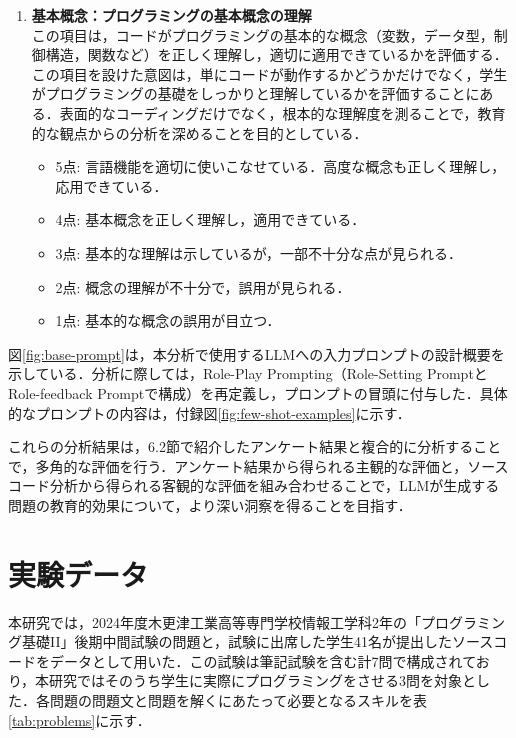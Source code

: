 \documentclass[11pt]{jreport}
\begin{document}
\begin{enumerate}
    \item \textbf{基本概念：プログラミングの基本概念の理解} \\
    この項目は，コードがプログラミングの基本的な概念（変数，データ型，制御構造，関数など）を正しく理解し，適切に適用できているかを評価する．この項目を設けた意図は，単にコードが動作するかどうかだけでなく，学生がプログラミングの基礎をしっかりと理解しているかを評価することにある．表面的なコーディングだけでなく，根本的な理解度を測ることで，教育的な観点からの分析を深めることを目的としている．
    \begin{itemize}
        \item 5点: 言語機能を適切に使いこなせている．高度な概念も正しく理解し，応用できている．
        \item 4点: 基本概念を正しく理解し，適用できている．
        \item 3点: 基本的な理解は示しているが，一部不十分な点が見られる．
        \item 2点: 概念の理解が不十分で，誤用が見られる．
        \item 1点: 基本的な概念の誤用が目立つ．
    \end{itemize}
\end{enumerate}
図\ref{fig:base-prompt}は，本分析で使用するLLMへの入力プロンプトの設計概要を示している．分析に際しては，Role-Play Prompting（Role-Setting PromptとRole-feedback Promptで構成）を再定義し，プロンプトの冒頭に付与した．具体的なプロンプトの内容は，付録図\ref{fig:few-shot-examples}に示す．

これらの分析結果は，6.2節で紹介したアンケート結果と複合的に分析することで，多角的な評価を行う．アンケート結果から得られる主観的な評価と，ソースコード分析から得られる客観的な評価を組み合わせることで，LLMが生成する問題の教育的効果について，より深い洞察を得ることを目指す．
\section{実験データ}

本研究では，2024年度木更津工業高等専門学校情報工学科2年の「プログラミング基礎II」後期中間試験の問題と，試験に出席した学生41名が提出したソースコードをデータとして用いた．この試験は筆記試験を含む計7問で構成されており，本研究ではそのうち学生に実際にプログラミングをさせる3問を対象とした．各問題の問題文と問題を解くにあたって必要となるスキルを表\ref{tab:problems}に示す．
\end{document}
